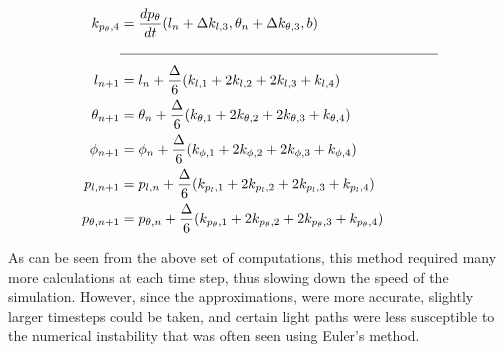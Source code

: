 \documentclass{article}
\begin{document}
\begin{align*}
k_{p_{\theta},4} &= \frac{d p_{\theta}}{d t}(l_{n}+\Delta k_{l,3}, \theta_{n} +\Delta k_{\theta,3}, b)\\
&\noindent\rule{8cm}{0.4pt}\\
l_{n+1}&=l_{n}+\frac{\Delta}{6} (k_{l,1}+2k_{l,2}+2k_{l,3}+k_{l,4})\\
\theta_{n+1}&=\theta_{n}+\frac{\Delta}{6} (k_{\theta,1}+2k_{\theta,2}+2k_{\theta,3}+k_{\theta,4})\\
\phi_{n+1}&=\phi_{n}+\frac{\Delta}{6} (k_{\phi,1}+2k_{\phi,2}+2k_{\phi,3}+k_{\phi,4})\\
p_{l,n+1}&=p_{l,n}+\frac{\Delta}{6} (k_{p_{l},1}+2k_{p_{l},2}+2k_{p_{l},3}+k_{p_{l},4})\\
p_{\theta,n+1}&=p_{\theta,n}+\frac{\Delta}{6} (k_{p_{\theta},1}+2k_{p_{\theta},2}+2k_{p_{\theta},3}+k_{p_{\theta},4})
\end{align*}

As can be seen from the above set of computations, this method required many more calculations at each time step, thus slowing down the speed of the simulation. However, since the approximations, were more accurate, slightly larger timesteps could be taken, and certain light paths were less susceptible to the numerical instability that was often seen using Euler's method.
\end{document}
